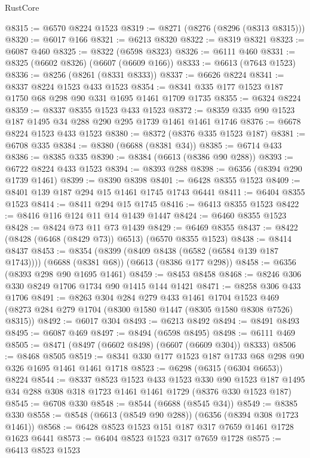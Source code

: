 \begin{lexlean}{RustCore}
\begin{coremodule}
{\begin{coremodule}
{{{{{{{{{{{{{{{{{{{{{{{{{{{{{{{{{{{{{{{{{{{{{{{@8315 := @6570 @8224 @1523
@8319 := @8271 (@8276 (@8296 (@8313 @8315)))
@8320 := @6017 @166
@8321 := @6213 @8320
@8322 := @8319 @8321
@8323 := @6087 @460
@8325 := @8322 (@6598 @8323)
@8326 := @6111 @460
@8331 := @8325 (@6602 @8326) (@6607 (@6609 @166))
@8333 := @6613 (@7643 @1523)
@8336 := @8256 (@8261 (@8331 @8333))
@8337 := @6626 @8224
@8341 := @8337 @8224 @1523 @433 @1523
@8354 := @8341 @335 @177 @1523 @187 @1750 @68 @298 @90 @331 @1695 @1461 @1709 @1735
@8355 := @6324 @8224
@8359 := @8337 @8355 @1523 @433 @1523
@8372 := @8359 @335 @90 @1523 @187 @1495 @34 @288 @290 @295 @1739 @1461 @1461 @1746
@8376 := @6678 @8224 @1523 @433 @1523
@8380 := @8372 (@8376 @335 @1523 @187)
@8381 := @6708 @335
@8384 := @8380 (@6688 (@8381 @34))
@8385 := @6714 @433
@8386 := @8385 @335
@8390 := @8384 (@6613 (@8386 @90 @288))
@8393 := @6722 @8224 @433 @1523
@8394 := @8393 @288
@8398 := @6356 (@8394 @290 @1739 @1461)
@8399 := @8390 @8398
@8401 := @6428 @8355 @1523
@8409 := @8401 @139 @187 @294 @15 @1461 @1745 @1743 @6441
@8411 := @6404 @8355 @1523
@8414 := @8411 @294 @15 @1745
@8416 := @6413 @8355 @1523
@8422 := @8416 @116 @124 @11 @14 @1439 @1447
@8424 := @6460 @8355 @1523
@8428 := @8424 @73 @11 @73 @1439
@8429 := @6469 @8355
@8437 := @8422 (@8428 (@6468 (@8429 @73)) @6513) (@6570 @8355 @1523)
@8438 := @8414 @8437
@8453 := @8354
    (@8399 (@8409 @8438 (@6582 (@6584 @139 @187 @1743))))
    (@6688 (@8381 @68))
    (@6613 (@8386 @177 @298))
@8458 := @6356 (@8393 @298 @90 @1695 @1461)
@8459 := @8453 @8458
@8468 := @8246 @306 @330 @8249 @1706 @1734 @90 @1415 @144 @1421
@8471 := @8258 @306 @433 @1706
@8491 := @8263
    @304
    @284
    @279
    @433
    @1461
    @1704
    @1523
    @469
    (@8273 @284 @279 @1704 (@8300 @1580 @1447 (@8305 @1580 @8308 @7526) @8315))
@8492 := @6017 @304
@8493 := @6213 @8492
@8494 := @8491 @8493
@8495 := @6087 @469
@8497 := @8494 (@6598 @8495)
@8498 := @6111 @469
@8505 := @8471 (@8497 (@6602 @8498) (@6607 (@6609 @304)) @8333)
@8506 := @8468 @8505
@8519 := @8341 @330 @177 @1523 @187 @1733 @68 @298 @90 @326 @1695 @1461 @1461 @1718
@8523 := @6298 (@6315 (@6304 @6653)) @8224
@8544 := @8337
    @8523
    @1523
    @433
    @1523
    @330
    @90
    @1523
    @187
    @1495
    @34
    @288
    @308
    @318
    @1723
    @1461
    @1461
    @1729
    (@8376 @330 @1523 @187)
@8545 := @6708 @330
@8548 := @8544 (@6688 (@8545 @34))
@8549 := @8385 @330
@8558 := @8548 (@6613 (@8549 @90 @288)) (@6356 (@8394 @308 @1723 @1461))
@8568 := @6428 @8523 @1523 @151 @187 @317 @7659 @1461 @1728 @1623 @6441
@8573 := @6404 @8523 @1523 @317 @7659 @1728
@8575 := @6413 @8523 @1523
}}}}}}}}}}}}}}}}}}}}}}}}}}}}}}}}}}}}}}}}}}}}}}}
\end{coremodule}}
\end{coremodule}
\end{lexlean}
